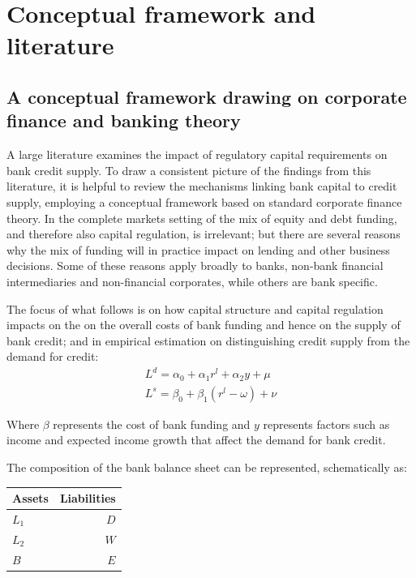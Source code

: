 \documentclass[
  12,
]{article}
\begin{document}
\hypertarget{literature}{%
\section{Conceptual framework and literature}\label{literature}}

\hypertarget{a-conceptual-framework-drawing-on-corporate-finance-and-banking-theory}{%
\subsection{A conceptual framework drawing on corporate finance and banking theory}\label{a-conceptual-framework-drawing-on-corporate-finance-and-banking-theory}}

A large literature examines the impact of regulatory capital requirements on bank credit supply. To draw a consistent picture of the findings from this literature, it is helpful to review the mechanisms linking bank capital to credit supply, employing a conceptual framework based on standard corporate finance theory. In the complete markets setting of \citet{modigliani58} the mix of equity and debt funding, and therefore also capital regulation, is irrelevant; but there are several reasons why the mix of funding will in practice impact on lending and other business decisions. Some of these reasons apply broadly to banks, non-bank financial intermediaries and non-financial corporates, while others are bank specific.

The focus of what follows is on how capital structure and capital regulation impacts on the on the overall costs of bank funding and hence on the supply of bank credit; and in empirical estimation on distinguishing credit supply from the demand for credit:
\[
\begin{split}
L^d =\alpha_0+\alpha_1 r^l+\alpha_2 y + \mu\\
L^s =\beta_0+\beta_1 (r^l-\omega)+\nu 
\end{split}
\]

Where \(\beta\) represents the cost of bank funding and \(y\) represents factors such as income and expected income growth that affect the demand for bank credit.

The composition of the bank balance sheet can be represented, schematically as:

\begin{center}
\begin{tabular}{ l | r}
Assets  & Liabilities \\
\hline
$L_1$   & $D$ \\
$L_2$   & $W$ \\
$B$ & $E$ \\
\hline
\end{tabular}
\end{center}
\end{document}
